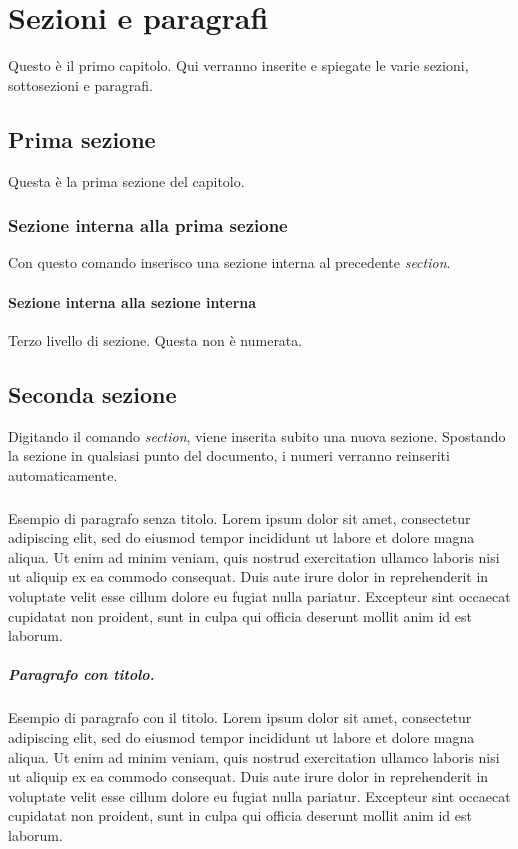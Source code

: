 \chapter{Sezioni e paragrafi}
Questo è il primo capitolo. Qui verranno inserite e spiegate le varie sezioni, sottosezioni e paragrafi.

\section{Prima sezione}
Questa è la prima sezione del capitolo.

\subsection{Sezione interna alla prima sezione}
Con questo comando inserisco una sezione interna al precedente \textit{section}.

\subsubsection{Sezione interna alla sezione interna}
Terzo livello di sezione. Questa non è numerata.

\section{Seconda sezione}
Digitando il comando \textit{section}, viene inserita subito una nuova sezione. Spostando la sezione in qualsiasi punto del documento, i numeri verranno reinseriti automaticamente.

\paragraph{} Esempio di paragrafo senza titolo. Lorem ipsum dolor sit amet, consectetur adipiscing elit, sed do eiusmod tempor incididunt ut labore et dolore magna aliqua. Ut enim ad minim veniam, quis nostrud exercitation ullamco laboris nisi ut aliquip ex ea commodo consequat. Duis aute irure dolor in reprehenderit in voluptate velit esse cillum dolore eu fugiat nulla pariatur. Excepteur sint occaecat cupidatat non proident, sunt in culpa qui officia deserunt mollit anim id est laborum.

\paragraph{Paragrafo con titolo.} Esempio di paragrafo con il titolo. Lorem ipsum dolor sit amet, consectetur adipiscing elit, sed do eiusmod tempor incididunt ut labore et dolore magna aliqua. Ut enim ad minim veniam, quis nostrud exercitation ullamco laboris nisi ut aliquip ex ea commodo consequat. Duis aute irure dolor in reprehenderit in voluptate velit esse cillum dolore eu fugiat nulla pariatur. Excepteur sint occaecat cupidatat non proident, sunt in culpa qui officia deserunt mollit anim id est laborum.
